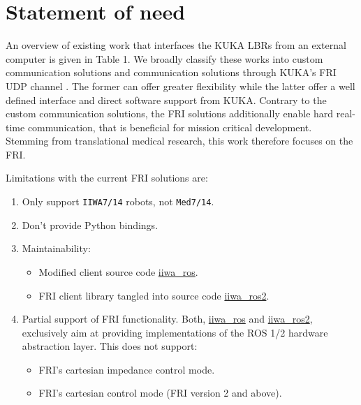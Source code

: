 \hypertarget{statement-of-need}{%
\section{Statement of need}\label{statement-of-need}}

An overview of existing work that interfaces the KUKA LBRs from an
external computer is given in Table 1. We broadly classify these works
into custom communication solutions
\cite{ref-iiwa_stack,ref-kuka_sunrise_toolbox,ref-libiiwa} and
communication solutions through KUKA's FRI UDP channel 
\cite{ref-iiwa_ros2,ref-iiwa_ros}. The
former can offer greater flexibility while the latter offer a well
defined interface and direct software support from KUKA. Contrary to the
custom communication solutions, the FRI solutions additionally enable
hard real-time communication, that is beneficial for mission critical
development. Stemming from translational medical research, this work
therefore focuses on the FRI.

Limitations with the current FRI solutions are:

\begin{enumerate}
\def\labelenumi{\arabic{enumi}.}
\item
  Only support \texttt{IIWA7/14} robots, not \texttt{Med7/14}.
\item
  Don't provide Python bindings.
\item
  Maintainability:

  \begin{itemize}
  \item
    Modified client source code
    \href{https://github.com/epfl-lasa/iiwa_ros}{iiwa\_ros}.
  \item
    FRI client library tangled into source code
    \href{https://github.com/ICube-Robotics/iiwa_ros2}{iiwa\_ros2}.
  \end{itemize}
\item
  Partial support of FRI functionality. Both,
  \href{https://github.com/epfl-lasa/iiwa_ros}{iiwa\_ros} and
  \href{https://github.com/ICube-Robotics/iiwa_ros2}{iiwa\_ros2},
  exclusively aim at providing implementations of the ROS 1/2 hardware
  abstraction layer. This does not support:

  \begin{itemize}
  \item
    FRI's cartesian impedance control mode.
  \item
    FRI's cartesian control mode (FRI version 2 and above).
  \end{itemize}
\end{enumerate}

